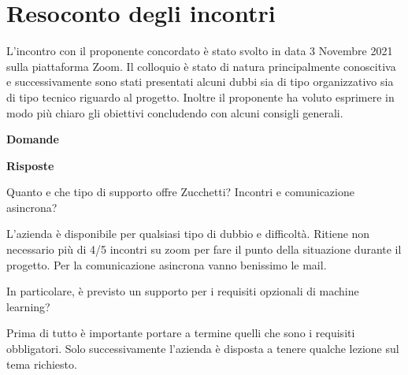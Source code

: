 \section{Resoconto degli incontri}
L’incontro con il proponente concordato è stato svolto in data 3 Novembre 2021 sulla piattaforma Zoom. Il colloquio è stato di natura principalmente conoscitiva e successivamente sono stati presentati alcuni dubbi sia di tipo organizzativo sia di tipo tecnico riguardo al progetto. Inoltre il proponente ha voluto esprimere in modo più chiaro gli obiettivi concludendo con alcuni consigli generali.

\begin{minipage}[b]{0.47\textwidth}
\centering
\textbf{Domande}
\end{minipage}
\hfill
\begin{minipage}[b]{0.47\textwidth}
\centering
\textbf{Risposte}
\end{minipage}

\begin{spacing}{3}
\end{spacing}

\begin{minipage}[c]{0.47\textwidth}
\centering
Quanto e che tipo di supporto offre Zucchetti? Incontri e comunicazione asincrona?
\end{minipage}
\hfill
\begin{minipage}[c]{0.47\textwidth}
\centering
L’azienda è disponibile per qualsiasi tipo di dubbio e difficoltà. Ritiene non necessario più di 4/5 incontri su zoom per fare il punto della situazione durante il progetto. Per la comunicazione asincrona vanno benissimo le mail.
\end{minipage}

\begin{spacing}{3}
\end{spacing}

\begin{minipage}[c]{0.47\textwidth}
\centering
In particolare, è previsto un supporto per i requisiti opzionali di machine learning?
\end{minipage}
\hfill
\begin{minipage}[c]{0.47\textwidth}
\centering
Prima di tutto è importante portare a termine quelli che sono i requisiti obbligatori. Solo successivamente l’azienda è disposta a tenere qualche lezione sul tema richiesto.
\end{minipage}

\begin{spacing}{3}
\end{spacing}

